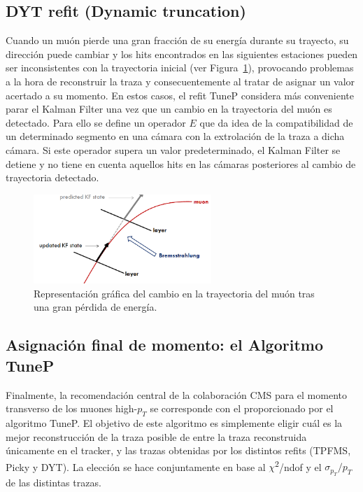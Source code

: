 \subsection{DYT refit (Dynamic truncation)}\label{sec:DYT}

Cuando un mu\'on pierde una gran fracci\'on de su energ\'ia durante su trayecto, su direcci\'on puede cambiar y los hits encontrados en las siguientes estaciones pueden ser inconsistentes con la trayectoria inicial (ver Figura~\ref{fig:energyloss}), provocando problemas a la hora de reconstruir la traza y consecuentemente al tratar de asignar un valor acertado a su momento. En estos casos, el refit TuneP considera m\'as conveniente parar el Kalman Filter una vez que un cambio en la trayectoria del mu\'on es detectado. Para ello se define un operador $E$ que da idea de la compatibilidad de un determinado segmento en una c\'amara con la extrolaci\'on de la traza a dicha c\'amara. Si este operador supera un valor predeterminado, el Kalman Filter se detiene y no tiene en cuenta aquellos hits en las c\'amaras posteriores al cambio de trayectoria detectado. 

\begin{figure}[h]
\centering
\includegraphics[width=0.60\textwidth]{figures/energyloss.png}
\caption{Representaci\'on gr\'afica del cambio en la trayectoria del mu\'on tras una gran p\'erdida de energ\'ia.}
\label{fig:energyloss}        
\end{figure}


\subsection{Asignaci\'on final de momento: el Algoritmo TuneP}\label{sec:TuneP}

Finalmente, la recomendaci\'on central de la colaboraci\'on CMS para el momento transverso de los muones high-$p_{T}$ se corresponde con el proporcionado por el algoritmo TuneP. El objetivo de este algoritmo es simplemente eligir cu\'al es la mejor reconstrucci\'on de la traza posible de entre la traza reconstruida \'unicamente en el tracker, y las trazas obtenidas por los distintos refits (TPFMS, Picky y DYT). La elecci\'on se hace conjuntamente en base al $\chi$\textsuperscript{2}/ndof y el $\sigma_{p_{T}}/p_{T}$ de las distintas trazas.
